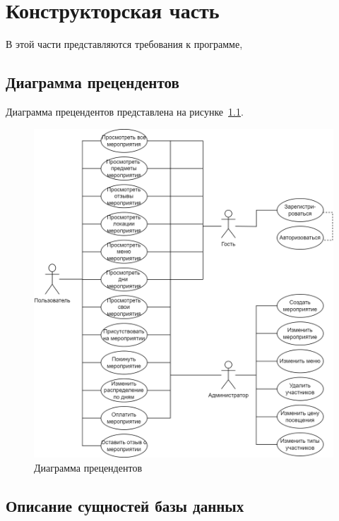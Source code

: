 \chapter{Конструкторская часть}

В этой части представляются требования к программе,

\section{Диаграмма прецендентов}

Диаграмма прецендентов представлена на рисунке~\ref{fig:use-case-diagram}.

\begin{figure}[h]
	\centering
	\includegraphics[width=1\textwidth]{images/use-case-diagram.png}
	\caption{Диаграмма прецендентов} 
	\label{fig:use-case-diagram} 
\end{figure}

\section{Описание сущностей базы данных}

